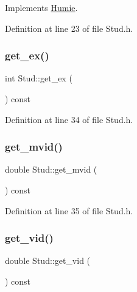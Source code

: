 Implements \mbox{\hyperlink{class_humie_a1bfe9cf46655ca5952b83c1652d8c0a1}{Humie}}.



Definition at line 23 of file Stud.\+h.

\mbox{\label{class_stud_ad9d3e3bdd3a203ea8d1a50f5fe850022}} 
\subsubsection{\texorpdfstring{get\_ex()}{get\_ex()}}
{\footnotesize\ttfamily int Stud\+::get\+\_\+ex (\begin{DoxyParamCaption}{ }\end{DoxyParamCaption}) const\hspace{0.3cm}{\ttfamily [inline]}}



Definition at line 34 of file Stud.\+h.

\mbox{\label{class_stud_af2dca7dde881ef1d7faa4fc25bd6fb8c}} 
\subsubsection{\texorpdfstring{get\_mvid()}{get\_mvid()}}
{\footnotesize\ttfamily double Stud\+::get\+\_\+mvid (\begin{DoxyParamCaption}{ }\end{DoxyParamCaption}) const\hspace{0.3cm}{\ttfamily [inline]}}



Definition at line 35 of file Stud.\+h.

\mbox{\label{class_stud_aa43897451b4f38e742d515fabb662f81}} 
\subsubsection{\texorpdfstring{get\_vid()}{get\_vid()}}
{\footnotesize\ttfamily double Stud\+::get\+\_\+vid (\begin{DoxyParamCaption}{ }\end{DoxyParamCaption}) const\hspace{0.3cm}{\ttfamily [inline]}}



